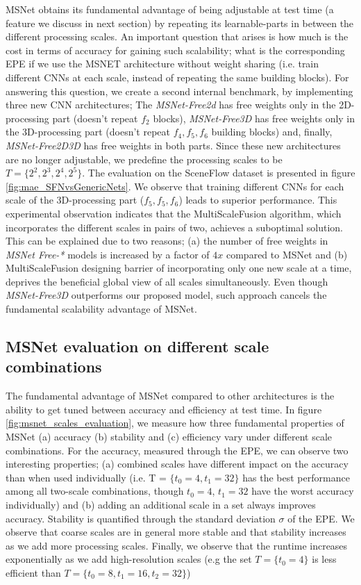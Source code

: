 \documentclass[runningheads]{llncs}
\begin{document}
MSNet obtains its fundamental advantage of being adjustable at test time (a feature we discuss in next section) by repeating its learnable-parts in between the different processing scales. An important question that arises is how much is the cost in terms of accuracy for gaining such scalability; what is the corresponding EPE if we use the MSNET architecture without weight sharing (i.e. train different CNNs at each scale, instead of repeating the same building blocks). For answering this question, we create a second internal benchmark, by implementing three new CNN architectures; The \textit{MSNet-Free2d} has free weights only in the 2D-processing part (doesn't repeat $f_2$ blocks), \textit{MSNet-Free3D} has free weights only in the 3D-processing part (doesn't repeat $f_4, f_5, f_6$ building blocks) and, finally, \textit{MSNet-Free2D3D} has free weights in both parts. Since these new architectures are no longer adjustable, we predefine the processing scales to be $T = \{2^2, 2^3, 2^4, 2^5\}$. The evaluation on the SceneFlow dataset is presented in figure \ref{fig:mae_SFNvsGenericNets}. We observe that training different CNNs for each scale of the 3D-processing part ($f_5, f_5, f_6$) leads to superior performance. This experimental observation indicates that the MultiScaleFusion algorithm, which incorporates the different scales in pairs of two, achieves a suboptimal solution. This can be explained due to two reasons; (a) the number of free weights in \textit{MSNet Free-*} models is increased by a factor of $4x$ compared to MSNet and (b) MultiScaleFusion designing barrier of incorporating only one new scale at a time, deprives the beneficial  global view of all scales simultaneously. Even though \textit{MSNet-Free3D} outperforms our proposed model, such approach cancels the fundamental scalability advantage of MSNet.

\subsection{MSNet evaluation on different scale combinations}

The fundamental advantage of MSNet compared to other architectures is the ability to get tuned between accuracy and efficiency at test time. In figure \ref{fig:msnet_scales_evaluation}, we measure how three fundamental properties of MSNet (a) accuracy (b) stability and (c) efficiency vary under different scale combinations. For the accuracy, measured through the EPE, we can observe two interesting properties; (a) combined scales have different impact on the accuracy than when used individually (i.e. T = $\{t_0=4,t_1=32\}$ has the best performance among all two-scale combinations, though $t_0=4$, $t_1=32$ have the worst accuracy individually) and (b) adding an additional scale in a set always improves accuracy. Stability is quantified through the standard deviation $\sigma$ of the EPE. We observe that coarse scales are in general more stable and that stability increases as we add more processing scales. Finally, we observe that the runtime increases exponentially as we add high-resolution scales (e.g the set $T = \{t_0=4\}$ is less efficient than $T = \{t_0=8, t_1 = 16, t_2 =32\}$)
\end{document}
